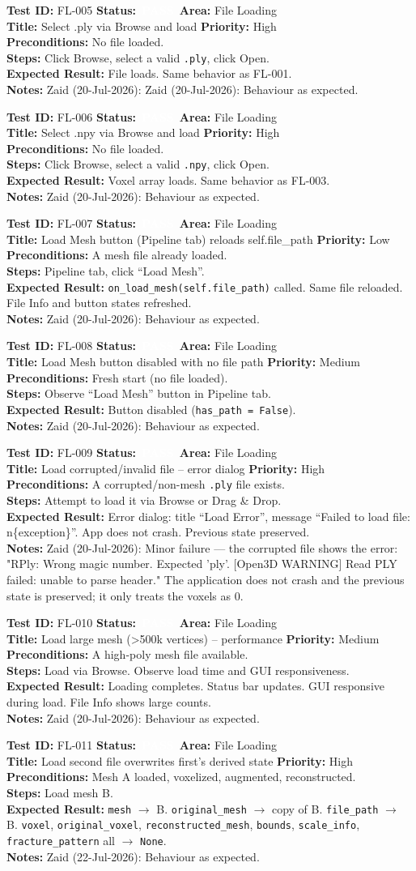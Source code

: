 \documentclass[12pt,a4paper]{article}
\newcommand{\statuspass}{\colorbox{statusgreen}{\textcolor{white}{\textbf{\,PASS\,}}}}
\newcommand{\testcase}[9]{%
  \smallskip
  \noindent\textbf{Test ID:} #1 \hfill \textbf{Status:} #2 \hfill \textbf{Area:} #3 \\
  \textbf{Title:} #4 \hfill \textbf{Priority:} #5 \\[0.3em]
  \textbf{Preconditions:} #6 \\[0.3em]
  \textbf{Steps:} #7 \\[0.3em]
  \textbf{Expected Result:} #8 \\
  \textbf{Notes:} #9
  \smallskip
}
\begin{document}
\testcase{FL-005}{\statuspass}{File Loading}{Select .ply via Browse and load}{High}{No file loaded.}{Click Browse, select a valid \texttt{.ply}, click Open.}{File loads. Same behavior as FL-001.}{Zaid (20-Jul-2026): Zaid (20-Jul-2026): Behaviour as expected.}


\testcase{FL-006}{\statuspass}{File Loading}{Select .npy via Browse and load}{High}{No file loaded.}{Click Browse, select a valid \texttt{.npy}, click Open.}{Voxel array loads. Same behavior as FL-003.}{Zaid (20-Jul-2026): Behaviour as expected.}


\testcase{FL-007}{\statuspass}{File Loading}{Load Mesh button (Pipeline tab) reloads self.file\_path}{Low}{A mesh file already loaded.}{Pipeline tab, click ``Load Mesh''.}{\texttt{on\_load\_mesh(self.file\_path)} called. Same file reloaded. File Info and button states refreshed.}{Zaid (20-Jul-2026): Behaviour as expected.}


\testcase{FL-008}{\statuspass}{File Loading}{Load Mesh button disabled with no file path}{Medium}{Fresh start (no file loaded).}{Observe ``Load Mesh'' button in Pipeline tab.}{Button disabled (\texttt{has\_path = False}).}{Zaid (20-Jul-2026): Behaviour as expected.}


\testcase{FL-009}{\statuspass}{File Loading}{Load corrupted/invalid file -- error dialog}{High}{A corrupted/non-mesh \texttt{.ply} file exists.}{Attempt to load it via Browse or Drag \& Drop.}{Error dialog: title ``Load Error'', message ``Failed to load file:\\n\{exception\}''. App does not crash. Previous state preserved.}{Zaid (20-Jul-2026): Minor failure --- the corrupted file shows the error: "RPly: Wrong magic number. Expected 'ply'. [Open3D WARNING] Read PLY failed: unable to parse header." The application does not crash and the previous state is preserved; it only treats the voxels as 0.}


\testcase{FL-010}{\statuspass}{File Loading}{Load large mesh (>500k vertices) -- performance}{Medium}{A high-poly mesh file available.}{Load via Browse. Observe load time and GUI responsiveness.}{Loading completes. Status bar updates. GUI responsive during load. File Info shows large counts.}{Zaid (20-Jul-2026): Behaviour as expected.}


\testcase{FL-011}{\statuspass}{File Loading}{Load second file overwrites first's derived state}{High}{Mesh A loaded, voxelized, augmented, reconstructed.}{Load mesh B.}{\texttt{mesh} $\rightarrow$ B. \texttt{original\_mesh} $\rightarrow$ copy of B. \texttt{file\_path} $\rightarrow$ B. \texttt{voxel}, \texttt{original\_voxel}, \texttt{reconstructed\_mesh}, \texttt{bounds}, \texttt{scale\_info}, \texttt{fracture\_pattern} all $\rightarrow$ \texttt{None}.}{Zaid (22-Jul-2026): Behaviour as expected.}
\end{document}
